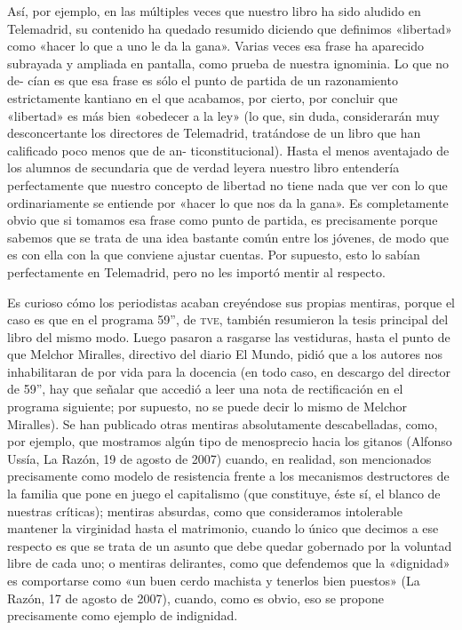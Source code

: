 \documentclass[draft,9pt,letterpaper,twocolumn,openany]{extbook}
\begin{document}
Así, por ejemplo, en las múltiples veces que nuestro libro ha sido aludido en Telemadrid, su contenido ha quedado resumido diciendo que definimos «libertad»
       como «hacer lo que a uno le da la gana». Varias veces esa frase ha aparecido subrayada y ampliada en pantalla, como prueba de nuestra ignominia. Lo que no de-
cían es que esa frase es sólo el punto de partida de un razonamiento estrictamente kantiano en el que acabamos, por cierto, por concluir que «libertad» es más bien
«obedecer a la ley» (lo que, sin duda, considerarán muy desconcertante los directores de Telemadrid, tratándose de un libro que han calificado poco menos que de an-
ticonstitucional). Hasta el menos aventajado de los alumnos de secundaria que de
verdad leyera nuestro libro entendería perfectamente que nuestro concepto de libertad no tiene nada que ver con lo que ordinariamente se entiende por «hacer lo
que nos da la gana». Es completamente obvio que si tomamos esa frase como punto de partida, es precisamente porque sabemos que se trata de una idea bastante
común entre los jóvenes, de modo que es con ella con la que conviene ajustar cuentas. Por supuesto, esto lo sabían perfectamente en Telemadrid, pero no les importó mentir al respecto.

Es curioso cómo los periodistas acaban creyéndose sus propias mentiras, porque el caso es que en el programa 59”, de \textsc{tve}, también resumieron la tesis principal del libro del mismo modo. Luego pasaron a rasgarse las vestiduras, hasta el
punto de que Melchor Miralles, directivo del diario El Mundo, pidió que a los autores nos inhabilitaran de por vida para la docencia (en todo caso, en descargo del
director de 59”, hay que señalar que accedió a leer una nota de rectificación en el
programa siguiente; por supuesto, no se puede decir lo mismo de Melchor Miralles).
Se han publicado otras mentiras absolutamente descabelladas, como, por ejemplo, que mostramos algún tipo de menosprecio hacia los gitanos (Alfonso Ussía,
La Razón, 19 de agosto de 2007) cuando, en realidad, son mencionados precisamente como modelo de resistencia frente a los mecanismos destructores de la familia que pone en juego el capitalismo (que constituye, éste sí, el blanco de nuestras críticas); mentiras absurdas, como que consideramos intolerable mantener la
virginidad hasta el matrimonio, cuando lo único que decimos a ese respecto es
que se trata de un asunto que debe quedar gobernado por la voluntad libre de cada
uno; o mentiras delirantes, como que defendemos que la «dignidad» es comportarse como «un buen cerdo machista y tenerlos bien puestos» (La Razón, 17 de agosto de 2007), cuando, como es obvio, eso se propone precisamente como ejemplo
de indignidad.
\end{document}
